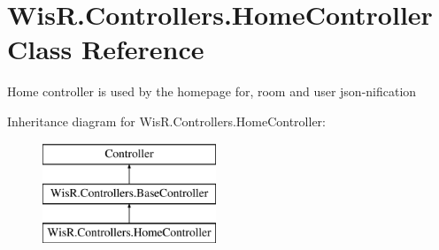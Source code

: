 \hypertarget{class_wis_r_1_1_controllers_1_1_home_controller}{}\section{Wis\+R.\+Controllers.\+Home\+Controller Class Reference}
\label{class_wis_r_1_1_controllers_1_1_home_controller}


Home controller is used by the homepage for, room and user json-\/nification  


Inheritance diagram for Wis\+R.\+Controllers.\+Home\+Controller\+:\begin{figure}[H]
\begin{center}
\leavevmode
\includegraphics[height=3.000000cm]{class_wis_r_1_1_controllers_1_1_home_controller}
\end{center}
\end{figure}
